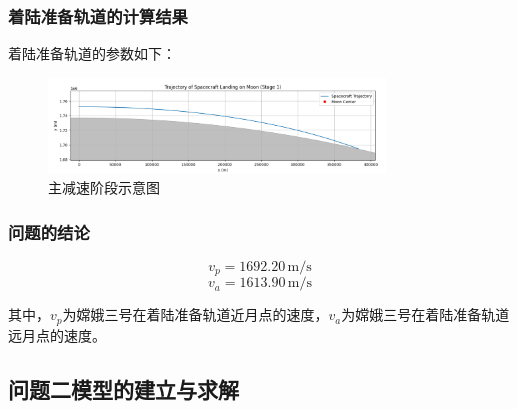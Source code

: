 \documentclass{ctexart}
\begin{document}
	\subsubsection{着陆准备轨道的计算结果}
着陆准备轨道的参数如下：
\begin{center}
\end{center}

    \begin{figure}[H] %
        \centering %
        \includegraphics[width=0.8\textwidth]{"./picture/stage1.png"} %
        \caption{主减速阶段示意图} %
        \label{fig:example} %
    \end{figure}
	\subsubsection{问题的结论}

\[v_p = 1692.20 \, \text{m} / \text{s}\]
\[v_a = 1613.90 \, \text{m} / \text{s}\]

其中，\(v_p\)为嫦娥三号在着陆准备轨道近月点的速度，\(v_a\)为嫦娥三号在着陆准备轨道远月点的速度。
    \subsection{问题二模型的建立与求解}
\end{document}
